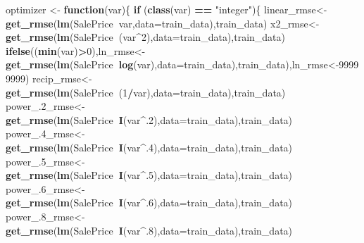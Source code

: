 \documentclass[]{article}
\newenvironment{Shaded}{\begin{snugshade}}{\end{snugshade}}
\newcommand{\ControlFlowTok}[1]{\textcolor[rgb]{0.13,0.29,0.53}{\textbf{#1}}}
\newcommand{\DataTypeTok}[1]{\textcolor[rgb]{0.13,0.29,0.53}{#1}}
\newcommand{\DecValTok}[1]{\textcolor[rgb]{0.00,0.00,0.81}{#1}}
\newcommand{\KeywordTok}[1]{\textcolor[rgb]{0.13,0.29,0.53}{\textbf{#1}}}
\newcommand{\NormalTok}[1]{#1}
\newcommand{\OperatorTok}[1]{\textcolor[rgb]{0.81,0.36,0.00}{\textbf{#1}}}
\newcommand{\StringTok}[1]{\textcolor[rgb]{0.31,0.60,0.02}{#1}}
\begin{document}
\begin{Shaded}
\begin{Highlighting}[]
\NormalTok{optimizer <-}\StringTok{ }\ControlFlowTok{function}\NormalTok{(var)\{}
  \ControlFlowTok{if}\NormalTok{ (}\KeywordTok{class}\NormalTok{(var) }\OperatorTok{==}\StringTok{ "integer"}\NormalTok{)\{}
\NormalTok{    linear_rmse<-}\KeywordTok{get_rmse}\NormalTok{(}\KeywordTok{lm}\NormalTok{(SalePrice}\OperatorTok{~}\NormalTok{var,}\DataTypeTok{data=}\NormalTok{train_data),train_data)}
\NormalTok{    x2_rmse<-}\KeywordTok{get_rmse}\NormalTok{(}\KeywordTok{lm}\NormalTok{(SalePrice}\OperatorTok{~}\NormalTok{(var}\OperatorTok{^}\DecValTok{2}\NormalTok{),}\DataTypeTok{data=}\NormalTok{train_data),train_data)}
    \KeywordTok{ifelse}\NormalTok{((}\KeywordTok{min}\NormalTok{(var)}\OperatorTok{>}\DecValTok{0}\NormalTok{),ln_rmse<-}\KeywordTok{get_rmse}\NormalTok{(}\KeywordTok{lm}\NormalTok{(SalePrice}\OperatorTok{~}\KeywordTok{log}\NormalTok{(var),}\DataTypeTok{data=}\NormalTok{train_data),train_data),ln_rmse<-}\DecValTok{99999999}\NormalTok{)}
\NormalTok{    recip_rmse<-}\KeywordTok{get_rmse}\NormalTok{(}\KeywordTok{lm}\NormalTok{(SalePrice}\OperatorTok{~}\NormalTok{(}\DecValTok{1}\OperatorTok{/}\NormalTok{var),}\DataTypeTok{data=}\NormalTok{train_data),train_data)}
\NormalTok{    power_.}\DecValTok{2}\NormalTok{_rmse<-}\KeywordTok{get_rmse}\NormalTok{(}\KeywordTok{lm}\NormalTok{(SalePrice}\OperatorTok{~}\KeywordTok{I}\NormalTok{(var}\OperatorTok{^}\NormalTok{.}\DecValTok{2}\NormalTok{),}\DataTypeTok{data=}\NormalTok{train_data),train_data)}
\NormalTok{    power_.}\DecValTok{4}\NormalTok{_rmse<-}\KeywordTok{get_rmse}\NormalTok{(}\KeywordTok{lm}\NormalTok{(SalePrice}\OperatorTok{~}\KeywordTok{I}\NormalTok{(var}\OperatorTok{^}\NormalTok{.}\DecValTok{4}\NormalTok{),}\DataTypeTok{data=}\NormalTok{train_data),train_data)}
\NormalTok{    power_.}\DecValTok{5}\NormalTok{_rmse<-}\KeywordTok{get_rmse}\NormalTok{(}\KeywordTok{lm}\NormalTok{(SalePrice}\OperatorTok{~}\KeywordTok{I}\NormalTok{(var}\OperatorTok{^}\NormalTok{.}\DecValTok{5}\NormalTok{),}\DataTypeTok{data=}\NormalTok{train_data),train_data)}
\NormalTok{    power_.}\DecValTok{6}\NormalTok{_rmse<-}\KeywordTok{get_rmse}\NormalTok{(}\KeywordTok{lm}\NormalTok{(SalePrice}\OperatorTok{~}\KeywordTok{I}\NormalTok{(var}\OperatorTok{^}\NormalTok{.}\DecValTok{6}\NormalTok{),}\DataTypeTok{data=}\NormalTok{train_data),train_data)}
\NormalTok{    power_.}\DecValTok{8}\NormalTok{_rmse<-}\KeywordTok{get_rmse}\NormalTok{(}\KeywordTok{lm}\NormalTok{(SalePrice}\OperatorTok{~}\KeywordTok{I}\NormalTok{(var}\OperatorTok{^}\NormalTok{.}\DecValTok{8}\NormalTok{),}\DataTypeTok{data=}\NormalTok{train_data),train_data)}

\end{Highlighting}
\end{Shaded}
\end{document}
